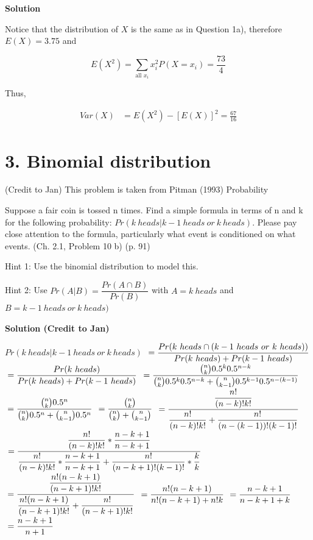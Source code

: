 \documentclass{article}\usepackage[]{graphicx}\usepackage[]{color}
\begin{document}
\textbf{Solution}

Notice that the distribution of $X$ is the same as in Question 1a), therefore $E(X) = 3.75$ and

$$E(X^2) = \sum_{\text{all $x_i$}} x_i^2 P(X = x_i) = \frac{73}{4}$$

Thus,

\begin{align}
Var(X) &= E(X^2) - [E(X)]^2 = \frac{67}{16}
\end{align}

\section*{3. Binomial distribution}

(Credit to Jan) This problem is taken from Pitman (1993) Probability

Suppose a fair coin is tossed n times. Find a simple formula in terms of n and k for the following probability: $Pr(k\ heads | k-1\ heads\ or\ k\ heads)$. Please pay close attention to the formula, particularly what event is conditioned on what events. (Ch. 2.1, Problem 10 b) (p. 91)

Hint 1: Use the binomial distribution to model this.

Hint 2: Use $Pr(A | B) = \dfrac{Pr (A \cap B)}{Pr (B)}$ with $A = k\ heads$ and $B = k-1\ heads\ or\ k\ heads)$

\textbf{Solution (Credit to Jan)}

$Pr(k\ heads | k-1\ heads\ or\ k\ heads)$
$\\= \dfrac{Pr(k\ heads \cap (k-1\ heads\ or\ k\ heads) )}{Pr (k\ heads) + Pr (k-1\ heads)}$
$\\= \dfrac{Pr(k\ heads)}{Pr (k\ heads) + Pr (k-1\ heads)}$
$\\ = \dfrac{\binom{n}{k}0.5^k0.5^{n-k}}{\binom{n}{k}0.5^k0.5^{n-k} + \binom{n}{k-1}0.5^{k-1}0.5^{n-(k-1)}}$
$\\ = \dfrac{\binom{n}{k}0.5^n}{\binom{n}{k}0.5^n + \binom{n}{k-1}0.5^n}$
$ \\ = \dfrac{\binom{n}{k}}{\binom{n}{k} + \binom{n}{k-1}}$
$\\ = \dfrac{\dfrac{n!}{(n-k)! k!}}{\dfrac{n!}{(n-k)! k!} + \dfrac{n!}{(n-(k-1))! (k-1)!}}$
$\\ = \dfrac{\dfrac{n!}{(n-k)! k!} * \dfrac{n-k+1}{n-k+1}}{\dfrac{n!}{(n-k)! k!} * \dfrac{n-k+1}{n-k+1} + \dfrac{n!}{(n-k+1)! (k-1)!}*\dfrac{k}{k}}$
$\\ = \dfrac{\dfrac{n!(n-k+1)}{(n-k+1)! k!}}{\dfrac{n!(n-k+1)}{(n-k+1)! k!} + \dfrac{n!}{(n-k+1)! k!}}$
$\\ = \dfrac{n!(n-k+1)}{n!(n-k+1)+n!k}$
$\\ = \dfrac{n-k+1}{n-k+1+k}$
$\\= \dfrac{n-k+1}{n+1}$
\end{document}
